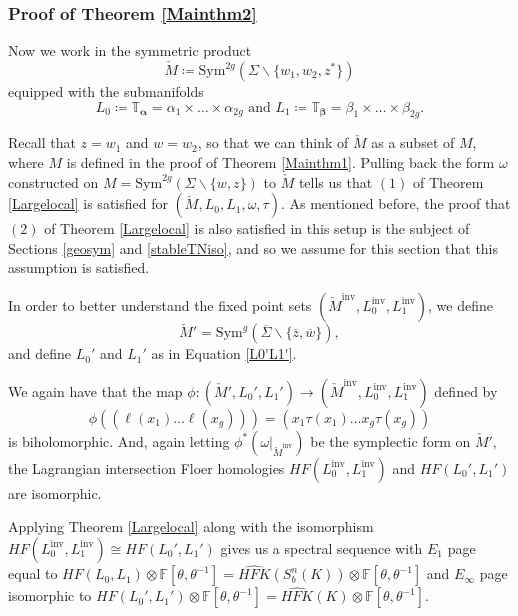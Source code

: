 \documentclass[11pt]{amsart}
\theoremstyle{definition}
\theoremstyle{remark}
\def\F{\mathbb{F}}
\def\Sym{\mathrm{Sym}}
\def\HFK {\mathit{HFK}}
\newcommand\HFKhat{\widehat{\HFK}}
\newcommand{\Lo}{L_0^{\operatorname{inv}}}
\newcommand{\Li}{L_1^{\operatorname{inv}}}
\numberwithin{equation}{section}
\begin{document}
\subsubsection{Proof of Theorem \ref{Mainthm2}}\label{pfmainthm2}
Now we work in the symmetric product
\begin{equation}
\check{M}\coloneq \Sym^{2g}(\Sigma\backslash\{w_1,w_2,z^*\})
\end{equation}
equipped with the submanifolds
\begin{equation}
L_0\coloneq \mathbb{T}_{\bm{\alpha}}=\alpha_1\times\hdots\times\alpha_{2g}\textrm{ and } L_1\coloneq \mathbb{T}_{\bm{\beta}}=\beta_1\times\hdots\times\beta_{2g}.
\end{equation}


Recall that $z=w_1$ and $w=w_2$, so that we can think of $\check{M}$ as a subset of $M$, where $M$ is defined in the proof of Theorem \ref{Mainthm1}. Pulling back the form $\omega$ constructed on $M=\Sym^{2g}(\Sigma\backslash\{w,z\})$ to $\check{M}$ tells us that $(1)$ of Theorem \ref{Largelocal} is satisfied for $(\check{M}, L_0, L_1, \omega, \tau).$ As mentioned before, the proof that $(2)$ of Theorem \ref{Largelocal} is also satisfied in this setup is the subject of Sections \ref{geosym} and \ref{stableTNiso}, and so we assume for this section that this assumption is satisfied.

In order to better understand the fixed point sets $(\check{M}^{\textrm{inv}}, \Lo, \Li)$, we define 
\begin{equation}\label{barM'}
\check{M}'=\Sym^g(\overline{\Sigma}\backslash \{\overline{z},\overline{w}\}),
\end{equation}
and define $L_0'$ and $L_1'$ as in Equation \ref{L0'L1'}.

We again have that the map $\phi\colon (\check{M}', L_0', L_1')\to (\check{M}^{\textrm{inv}}, \Lo, \Li)$ defined by 
\begin{equation}
    \phi((\ell(x_1)\hdots \ell(x_g)))=(x_1\tau(x_1)\hdots x_g\tau(x_g))
\end{equation}
is biholomorphic. And, again letting $\phi^*(\omega|_{\check{M}^{\textrm{inv}}})$ be the symplectic form on $\check{M}',$ the Lagrangian intersection Floer homologies $HF(\Lo, \Li)$ and $HF(L_0', L_1')$ are isomorphic. 

Applying Theorem \ref{Largelocal} along with the isomorphism $HF(\Lo, \Li)\cong HF(L_0', L_1')$ gives us a spectral sequence with $E_1$ page equal to $HF(L_0,L_1)\otimes \F[\theta,\theta^{-1}]=\HFKhat(S_b^n(K))\otimes \F[\theta,\theta^{-1}]$ and $E_\infty$ page isomorphic to $HF(L_0', L_1')\otimes \F[\theta,\theta^{-1}]=\HFKhat(K)\otimes \F[\theta,\theta^{-1}].$ 
\end{document}

